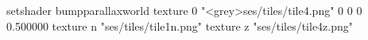 setshader bumpparallaxworld
texture 0 "<grey>ses/tiles/tile4.png" 0 0 0 0.500000
texture n "ses/tiles/tile1n.png"
texture z "ses/tiles/tile4z.png"

